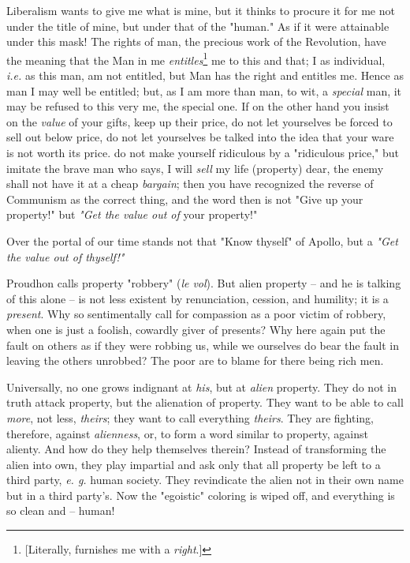 \documentclass[a4paper]{book}
\begin{document}
Liberalism wants to give me what is mine, but it thinks to procure it for me 
not under the title of mine, but under that of the "{}human."{} As if it were 
attainable under this mask! The rights of man, the precious work of the 
Revolution, have the meaning that the Man in me 
\textit{entitles}\footnote{[Literally, furnishes me with a \textit{right}.]} 
me to this and that; I as individual, \textit{i.e.} as this man, am not 
entitled, but Man has the right and entitles me. Hence as man I may well be 
entitled; but, as I am more than man, to wit, a \textit{special} man, it may 
be refused to this very me, the special one. If on the other hand you insist 
on the \textit{value} of your gifts, keep up their price, do not let 
yourselves be forced to sell out below price, do not let yourselves be talked 
into the idea that your ware is not worth its price. do not make yourself 
ridiculous by a "{}ridiculous price,"{} but imitate the brave man who says, I 
will \textit{sell} my life (property) dear, the enemy shall not have it at a 
cheap \textit{bargain}; then you have recognized the reverse of Communism as 
the correct thing, and the word then is not "{}Give up your property!"{} but 
\textit{"{}Get the value out of} your property!"{}

Over the portal of our time stands not that "{}Know thyself"{} of Apollo, but 
a \textit{"{}Get the value out of thyself!"{}}

Proudhon calls property "{}robbery"{} (\textit{le vol}). But alien property -- 
and he is talking of this alone -- is not less existent by renunciation, 
cession, and humility; it is a \textit{present}. Why so sentimentally call for 
compassion as a poor victim of robbery, when one is just a foolish, cowardly 
giver of presents? Why here again put the fault on others as if they were 
robbing us, while we ourselves do bear the fault in leaving the others 
unrobbed? The poor are to blame for there being rich men.

Universally, no one grows indignant at \textit{his}, but at \textit{alien} 
property. They do not in truth attack property, but the alienation of 
property. They want to be able to call \textit{more}, not less, 
\textit{theirs}; they want to call everything \textit{theirs}. They are 
fighting, therefore, against \textit{alienness}, or, to form a word similar to 
property, against alienty. And how do they help themselves therein? Instead of 
transforming the alien into own, they play impartial and ask only that all 
property be left to a third party, \textit{e. g.} human society. They 
revindicate the alien not in their own name but in a third party's. Now the 
"{}egoistic"{} coloring is wiped off, and everything is so clean and -- human!
\end{document}
